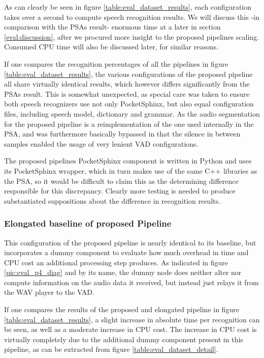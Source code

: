 As can clearly be seen in figure \ref{table:eval_dataset_results}, each configuration takes over a second to compute speech recognition results.
We will discuss this -in comparison with the PSAs result- enormous time at a later in section \ref{eval:discussion}, after we procured more insight to the proposed pipelines scaling.
Consumed CPU time will also be discussed later, for similar reasons.

If one compares the recognition percentages of all the pipelines in figure \ref{table:eval_dataset_results}, the various configurations of the proposed pipeline all share virtually identical results, which however differs significantly from the PSAs result.
This is somewhat unexpected, as special care was taken to ensure both speech recognizers use not only PocketSphinx, but also equal configuration files, including speech model, dictionary and grammar.
As the audio segmentation for the proposed pipeline is a reimplementation of the one used internally in the PSA, and was furthermore basically bypassed in that the silence in between samples enabled the usage of very lenient VAD configurations.

The proposed pipelines PocketSphinx component is written in Python and uses its PocketSphinx wrapper, which in turn makes use of the same C++ libraries as the PSA, so it would be difficult to claim this as the determining difference responsible for this discrepancy.
Clearly more testing is needed to produce substantiated suppositions about the difference in recognition results.



\subsubsection{Elongated baseline of proposed Pipeline}
This configuration of the proposed pipeline is nearly identical to its baseline, but incorporates a dummy component to evaluate how much overhead in time and CPU cost an additional processing step produces.
As indicated in figure \ref{pic:eval_p4_diag} and by its name, the dummy node does neither alter nor compute information on the audio data it received, but instead just relays it from the WAV player to the VAD.

If one compares the results of the proposed and elongated pipeline in figure \ref{table:eval_dataset_results}, a slight increase in absolute time per recognition can be seen, as well as a moderate increase in CPU cost.
The increase in CPU cost is virtually completely due to the additional dummy component present in this pipeline, as can be extracted from figure \ref{table:eval_dataset_detail}. 

